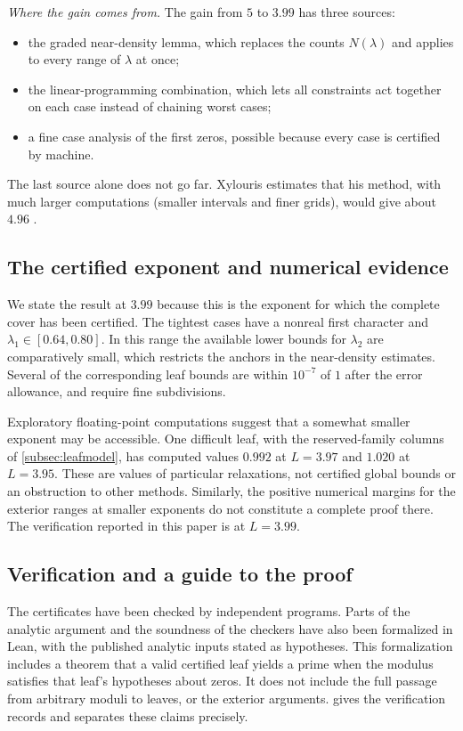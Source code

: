 \emph{Where the gain comes from.} The gain from $5$ to $3.99$ has three sources:
\begin{itemize}
  \item the graded near-density lemma, which replaces the counts $N(\lambda)$ and applies to every
    range of $\lambda$ at once;
  \item the linear-programming combination, which lets all constraints act together on each
    case instead of chaining worst cases;
  \item a fine case analysis of the first zeros, possible because every case is certified by
    machine.
\end{itemize}
The last source alone does not go far. Xylouris estimates that his method, with much larger
computations (smaller intervals and finer grids), would give about $4.96$ \cite[p.~82]{Xylouris2018linnik}.

\subsection{The certified exponent and numerical evidence}\label{subsec:why}
We state the result at $3.99$ because this is the exponent for which the complete cover
has been certified. The tightest cases have a nonreal first character and
$\lambda_1\in[0.64,0.80]$. In this range the available lower bounds for $\lambda_2$ are
comparatively small, which restricts the anchors in the near-density estimates.
Several of the corresponding leaf bounds are within $10^{-7}$ of $1$ after the error
allowance, and require fine subdivisions.

Exploratory floating-point computations suggest that a somewhat smaller exponent may
be accessible. One difficult leaf, with the reserved-family columns of
\cref{subsec:leafmodel}, has computed values $0.992$ at $L=3.97$ and $1.020$ at $L=3.95$.
These are values of particular relaxations, not certified global bounds or an obstruction
to other methods. Similarly, the positive numerical margins for the exterior ranges at
smaller exponents do not constitute a complete proof there. The verification reported in
this paper is at $L=3.99$.

\subsection{Verification and a guide to the proof}\label{subsec:checked}
The certificates have been checked by independent programs. Parts of the analytic
argument and the soundness of the checkers have also been formalized in Lean, with the
published analytic inputs stated as hypotheses. This formalization includes a theorem
that a valid certified leaf yields a prime when the modulus satisfies that leaf's
hypotheses about zeros. It does not include the full passage from arbitrary moduli to
leaves, or the exterior arguments.  gives the verification records
and separates these claims precisely.

